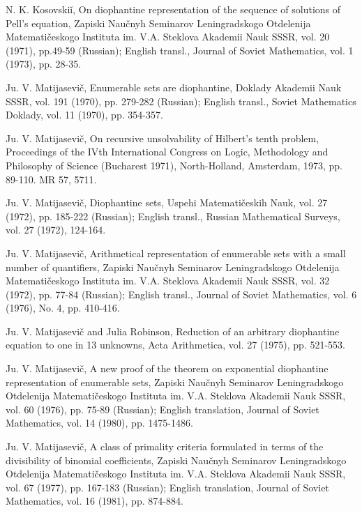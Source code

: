 \documentclass[11pt,a4paper]{article}
\begin{document}
\begin{list}{}{\setlength{\leftmargin}{2.4em}\setlength{\labelwidth}{2em}\setlength{\labelsep}{.4em}\setlength{\itemsep}{.5em}}
\item[\textup{[10]}] N. K. Kosovskiǐ, On diophantine representation of the sequence of solutions of Pell's equation, Zapiski Naučnyh Seminarov Leningradskogo Otdelenija Matematičeskogo Instituta im. V.A. Steklova Akademii Nauk SSSR, vol. 20 (1971), pp.49-59 (Russian); English transl., Journal of Soviet Mathematics, vol. 1 (1973), pp. 28-35.
\item[\textup{[11]}] Ju. V. Matijasevič, Enumerable sets are diophantine, Doklady Akademii Nauk SSSR, vol. 191 (1970), pp. 279-282 (Russian); English transl., Soviet Mathematics Doklady, vol. 11 (1970), pp. 354-357.
\item[\textup{[12]}] Ju. V. Matijasevič, On recursive unsolvability of Hilbert's tenth problem, Proceedings of the IVth International Congress on Logic, Methodology and Philosophy of Science (Bucharest 1971), North-Holland, Amsterdam, 1973, pp. 89-110. MR 57, 5711.
\item[\textup{[13]}] Ju. V. Matijasevič, Diophantine sets, Uspehi Matematičeskih Nauk, vol. 27 (1972), pp. 185-222 (Russian); English transl., Russian Mathematical Surveys, vol. 27 (1972), 124-164.
\item[\textup{[14]}] Ju. V. Matijasevič, Arithmetical representation of enumerable sets with a small number of quantifiers, Zapiski Naučnyh Seminarov Leningradskogo Otdelenija Matematičeskogo Instituta im. V.A. Steklova Akademii Nauk SSSR, vol. 32 (1972), pp. 77-84 (Russian); English transl., Journal of Soviet Mathematics, vol. 6 (1976), No. 4, pp. 410-416.
\item[\textup{[15]}] Ju. V. Matijasevič and Julia Robinson, Reduction of an arbitrary diophantine equation to one in 13 unknowns, Acta Arithmetica, vol. 27 (1975), pp. 521-553.
\item[\textup{[16]}] Ju. V. Matijasevič, A new proof of the theorem on exponential diophantine representation of enumerable sets, Zapiski Naučnyh Seminarov Leningradskogo Otdelenija Matematičeskogo Instituta im. V.A. Steklova Akademii Nauk SSSR, vol. 60 (1976), pp. 75-89 (Russian); English translation, Journal of Soviet Mathematics, vol. 14 (1980), pp. 1475-1486.
\item[\textup{[17]}] Ju. V. Matijasevič, A class of primality criteria formulated in terms of the divisibility of binomial coefficients, Zapiski Naučnyh Seminarov Leningradskogo Otdelenija Matematičeskogo Instituta im. V.A. Steklova Akademii Nauk SSSR, vol. 67 (1977), pp. 167-183 (Russian); English translation, Journal of Soviet Mathematics, vol. 16 (1981), pp. 874-884.

\end{list}
\end{document}
